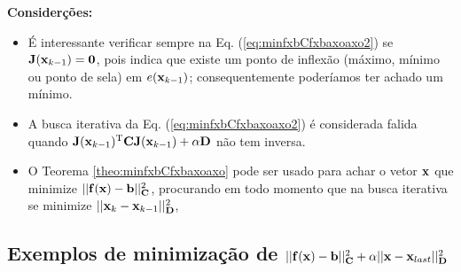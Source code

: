 \begin{theorem}
\textbf{Considerções:}

\begin{itemize}
\item É interessante verificar sempre na Eq. (\ref{eq:minfxbCfxbaxoaxo2}) 
se  $\MATRIX{J}(\VECTOR{x}_{k-1}) = \MATRIX{0}$,
pois indica que existe um ponto de inflexão 
(máximo, mínimo ou ponto de sela) em $e(\VECTOR{x}_{k-1})$;
consequentemente poderíamos ter achado um mínimo.
\item A busca iterativa da Eq. (\ref{eq:minfxbCfxbaxoaxo2}) é considerada falida quando 
$\MATRIX{J}(\VECTOR{x}_{k-1})^{\transpose}\MATRIX{C} \MATRIX{J}(\VECTOR{x}_{k-1}) +\alpha\MATRIX{D}$
não tem inversa.
\end{itemize}


\end{theorem} 


\begin{tcbattention}
\begin{itemize}
\item O Teorema \ref{theo:minfxbCfxbaxoaxo} pode ser usado para achar o vetor $\VECTOR{x}$
que minimize $||\VECTOR{f}(\VECTOR{x})-\VECTOR{b}||_{\MATRIX{C}}^2$, procurando 
em todo momento que na busca iterativa se minimize $||\VECTOR{x}_{k}-\VECTOR{x}_{k-1}||_{\MATRIX{D}}^2$,
\end{itemize}
\end{tcbattention}

\subsection{Exemplos de minimização de 
$||\VECTOR{f}(\VECTOR{x})-\VECTOR{b}||_{\MATRIX{C}}^2+\alpha||\VECTOR{x}-\VECTOR{x}_{last}||_{\MATRIX{D}}^2$}



